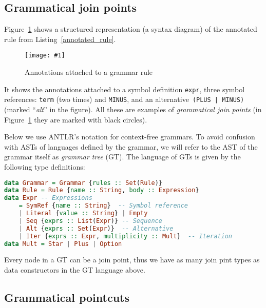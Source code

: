 \documentclass{IOS-Book-Article}     %
\newcommand{\fig}[2]{%
\begin{figure}%
\centering%
\texttt{[image: \#1]}%
\caption{#2}\label{#1}%
\end{figure}%
}
\newcommand{\lstref}[1]{Listing~\ref{#1}}
\newcommand{\figref}[1]{Figure~\ref{#1}}
\newcommand{\tool}[1]{\textsc{#1}}
\begin{document}
\subsection{Grammatical join points}
\figref{structured} shows a structured representation (a syntax diagram) of the annotated rule from \lstref{annotated_rule}. 
\fig{structured}{Annotations attached to a grammar rule}
It shows the annotations attached to a symbol definition \texttt{expr}, three symbol references: \texttt{term} (two times) and \texttt{MINUS}, and an alternative~\texttt{(PLUS | MINUS)} (marked ``\emph{alt}'' in the figure). All these are examples of \emph{grammatical join points} (in \figref{structured} they are marked with black circles). 

Below we use \tool{ANTLR}'s notation for context-free grammars. To avoid confusion with ASTs of languages defined by the grammar, we will refer to the AST of the grammar itself as \emph{grammar tree} (GT). The language of GTs is given by the following type definitions:
\begin{lstlisting}[language=Haskell]
data Grammar = Grammar {rules :: Set(Rule)}
data Rule = Rule {name :: String, body :: Expression}
data Expr -- Expressions
	= SymRef {name :: String}  -- Symbol reference
	| Literal {value :: String} | Empty
	| Seq {exprs :: List(Expr)} -- Sequence
	| Alt {exprs :: Set(Expr)}  -- Alternative
	| Iter {exprs :: Expr, multiplicity :: Mult}  -- Iteration
data Mult = Star | Plus | Option
\end{lstlisting}
Every node in a GT can be a join point, thus we have as many join pint types as data constructors in the GT language above.

\subsection{Grammatical pointcuts}
\end{document}
